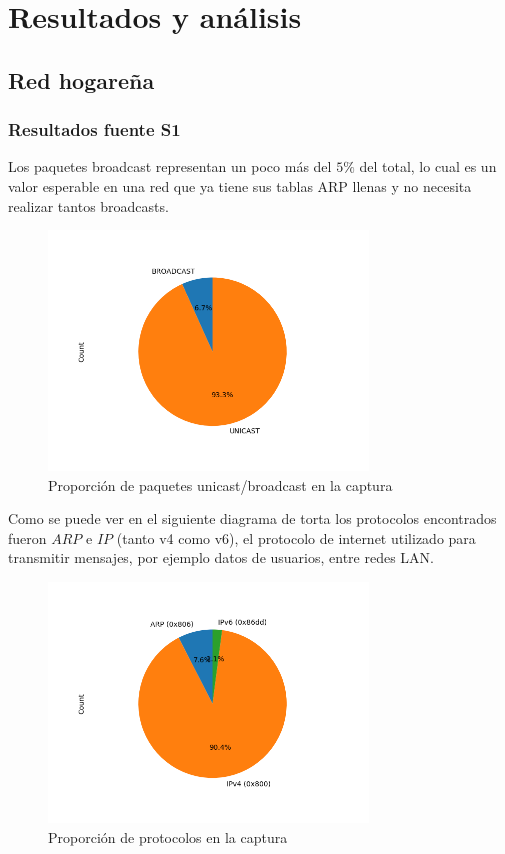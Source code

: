 \section{Resultados y análisis}

\subsection*{Red hogareña}
\subsubsection*{Resultados fuente S1}


Los paquetes broadcast representan un poco más del $5\%$ del total, lo cual es un valor esperable en una red que ya tiene sus tablas ARP llenas y no necesita realizar tantos broadcasts.

\begin{figure}[H]
 \centering
 \includegraphics[width=8.5cm]{figs/broadcast_proportion_hogar_ethernet_S1_output.png}
 \caption{\normalfont Proporción de paquetes unicast/broadcast en la captura}
\end{figure}

Como se puede ver en el siguiente diagrama de torta los protocolos encontrados fueron $ARP$ e $IP$ (tanto v4 como v6), el protocolo de internet utilizado para transmitir mensajes, por ejemplo datos de usuarios, entre redes LAN.

\begin{figure}[H]
 \centering
 \includegraphics[width=8.5cm]{figs/protocols_proportion_hogar_ethernet_S1_output.png}
 \caption{\normalfont Proporción de protocolos en la captura}
\end{figure}

